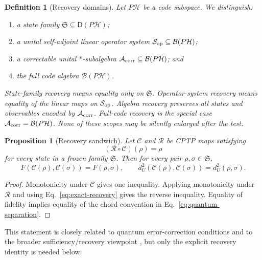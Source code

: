 \documentclass[11pt]{article}
\newtheorem{definition}{Definition}
\newtheorem{proposition}{Proposition}
\begin{document}
\begin{definition}[Recovery domains]
Let \(P\mathcal H\) be a code subspace.  We distinguish:
\begin{enumerate}[label=(R\arabic*)]
 \item a state family \(\mathfrak S\subseteq\mathsf D(P\mathcal H)\);
 \item a unital self-adjoint linear operator system
 \(\mathcal S_{\rm op}\subseteq\mathcal B(P\mathcal H)\);
 \item a correctable unital \(*\)-subalgebra
 \(\mathcal A_{\rm corr}\subseteq\mathcal B(P\mathcal H)\); and
 \item the full code algebra \(\mathcal B(P\mathcal H)\).
\end{enumerate}
State-family recovery means equality only on \(\mathfrak S\).  Operator-system
recovery means equality of the linear maps on \(\mathcal S_{\rm op}\).
Algebra recovery preserves all states and observables encoded by
\(\mathcal A_{\rm corr}\).  Full-code recovery is the special case
\(\mathcal A_{\rm corr}=\mathcal B(P\mathcal H)\).  None of these scopes may be
silently enlarged after the test.
\end{definition}

\begin{proposition}[Recovery sandwich]
Let \(\mathcal C\) and \(\mathcal R\) be CPTP maps satisfying
\begin{equation}
 (\mathcal R\circ\mathcal C)(\rho)=\rho
 \label{eq:exact-recovery}
\end{equation}
for every state in a frozen family \(\mathfrak S\).  Then for every pair
\(\rho,\sigma\in\mathfrak S\),
\begin{equation}
 F(\mathcal C(\rho),\mathcal C(\sigma))=F(\rho,\sigma),
 \qquad
 d_U^2(\mathcal C(\rho),\mathcal C(\sigma))=d_U^2(\rho,\sigma).
 \label{eq:recovery-isometry}
\end{equation}
\end{proposition}
\begin{proof}
Monotonicity under \(\mathcal C\) gives one inequality.  Applying monotonicity
under \(\mathcal R\) and using Eq.~\eqref{eq:exact-recovery} gives the reverse
inequality.  Equality of fidelity implies equality of the chord convention in
Eq.~\eqref{eq:quantum-separation}.
\end{proof}

This statement is closely related to quantum error-correction conditions
\cite{KnillLaflamme1997} and to the broader sufficiency/recovery viewpoint
\cite{Petz1986}, but only the explicit recovery identity is needed below.
\end{document}
